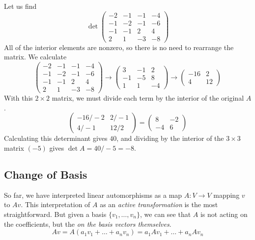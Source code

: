   \begin{example}
    \label{ex:computing-a-4times4-determinant}
    Let us find
    \begin{equation}
      \det{\begin{pmatrix}
      -2&-1&-1&-4\\-1&-2&-1&-6\\-1&-1&2&4\\2&1&-3&-8
      \end{pmatrix}}
    \end{equation}
    All of the interior elements are nonzero, so there is no need to rearrange the matrix. We calculate
    \begin{equation}
      \begin{pmatrix}
      -2&-1&-1&-4\\-1&-2&-1&-6\\-1&-1&2&4\\2&1&-3&-8
      \end{pmatrix} \rightarrow \begin{pmatrix}
      3&-1&2\\-1&-5&8\\1&1&-4
      \end{pmatrix} \rightarrow \begin{pmatrix}
      -16&2\\4&12
      \end{pmatrix}
    \end{equation}
    With this $2 \times 2$ matrix, we must divide each term by the interior of the original $A$. 
    \begin{equation}
      \begin{pmatrix}
      -16/-2 & 2/-1\\4/-1 & 12/2
      \end{pmatrix} = \begin{pmatrix}
      8&-2\\-4&6
      \end{pmatrix}
    \end{equation}
    Calculating this determinant gives $40$, and dividing by the interior of the $3 \times 3$ matrix $(-5)$ gives $\det{A} = 40/-5 = -8$. 
  \end{example}

\subsection{Change of Basis}

	So far, we have interpreted linear automorphisms as a map $A: V \to V$ mapping $v$ to $Av$. This interpretation of $A$ as an \textit{active transformation} is the most straightforward. But given a basis $\{v_1, \ldots, v_n\}$, we can see that $A$ is not acting on the coefficients, but the \textit{on the basis vectors themselves}. 
	\begin{equation}
	  Av = A (a_1 v_1 + \ldots + a_n v_n) = a_1 Av_1 + \ldots + a_n A v_n
	\end{equation}

